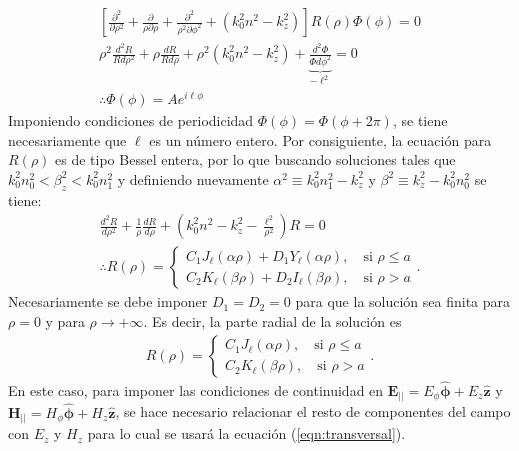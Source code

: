 \begin{align}
	\left[\frac{\partial^2}{\partial \rho^2} + \frac{\partial}{\rho\partial \rho} + \frac{\partial^2}{\rho^2\partial \phi^2} +\left( k_0^2n^2 - k_z^2 \right)\right]  R(\rho)\Phi(\phi) = 0
	\nonumber
	\\
\rho^2\frac{d^2 R}{Rd\rho^2} + \rho\frac{dR}{Rd\rho} + \rho^2\left( k_0^2n^2 - k_z^2 \right) + \underbrace{\frac{d^2 \Phi}{\Phi d\phi^2}}_{-\ell^2} = 0
\nonumber
\\
\therefore \Phi(\phi) = A e^{i\ell\phi}
\nonumber
\end{align}
Imponiendo condiciones de periodicidad $\Phi(\phi)=\Phi(\phi + 2\pi)$, se tiene necesariamente que $\ell$ es un número entero. Por consiguiente, la ecuación para $R(\rho)$ es de tipo Bessel entera, por lo que buscando soluciones tales que $k_0^2 n_0^2 < \beta_z^2 < k_0^2 n_1^2$ y definiendo nuevamente $\alpha^2 \equiv k_0^2n_1^2 - k_z^2$ y $\beta^2\equiv k_z^2 - k_0^2n_0^2$ se tiene:
\begin{align}
	\frac{d^2 R}{d\rho^2} + \frac{1}{\rho}\frac{dR}{d\rho} + \left( k_0^2n^2 - k_z^2 -\frac{\ell^2}{\rho^2}\right)R  = 0
	\nonumber
	\\
	\therefore R(\rho) = 
	\left\{
	\begin{matrix}	
	C_1 J_\ell (\alpha\rho) + D_1 Y_\ell (\alpha\rho), \quad \text{si } \rho \le a  
	\\
	C_2 K_\ell (\beta\rho) + D_2 I_\ell (\beta\rho), \quad \text{si } \rho > a  
	\end{matrix}
	\right.
	. \nonumber
\end{align}
Necesariamente se debe imponer $D_1 = D_2 = 0$ para que la solución sea finita para $\rho = 0$ y para $\rho \to +\infty$. Es decir, la parte radial de la solución es
\begin{align*}
 R(\rho) = 
	\left\{
	\begin{matrix}	
	C_1 J_\ell (\alpha\rho), \quad \text{si } \rho \le a  
	\\
	C_2 K_\ell (\beta\rho), \quad \text{si } \rho > a  
	\end{matrix}
	\right.
	. \nonumber
\end{align*}
En este caso, para imponer las condiciones de continuidad en $\textbf{E}_{||} = E_\phi \boldsymbol{\hat{\phi}} + E_z \hat{\textbf{z}}$ y $\textbf{H}_{||}= H_\phi \hat{\boldsymbol{\phi}} + H_z \hat{\textbf{z}}$, se hace necesario relacionar el resto de componentes del campo con $E_z$ y $H_z$ para lo cual se usará la ecuación (\ref{eqn:transversal}). 

